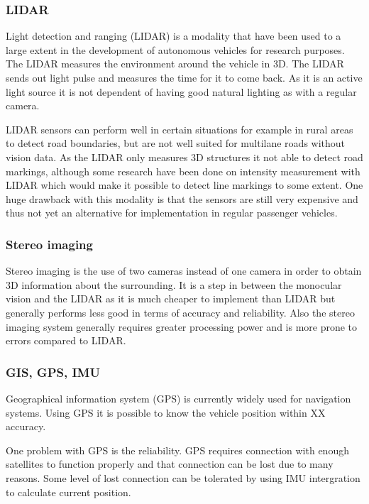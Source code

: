 \subsubsection{LIDAR}
Light detection and ranging (LIDAR) is a modality that have been used to a large extent in the development of autonomous vehicles for research purposes. The LIDAR measures the environment around the vehicle in 3D. The LIDAR sends out light pulse and measures the time for it to come back. As it is an active light source it is not dependent of having good natural lighting as with a regular camera. 

LIDAR sensors can perform well in certain situations for example in rural areas to detect road boundaries, \cite{BarHillel2014} but are not well suited for multilane roads without vision data. As the LIDAR only measures 3D structures it not able to detect road markings, although some research have been done on intensity measurement with LIDAR \cite{huang2009finding} \cite{kammel2008lidar} which would make it possible to detect line markings to some extent. One huge drawback with this modality is that the sensors are still very expensive and thus not yet an alternative for implementation in regular passenger vehicles.

\subsubsection{Stereo imaging}
Stereo imaging is the use of two cameras instead of one camera in order to obtain 3D information about the surrounding. It is a step in between the monocular vision and the LIDAR as it is much cheaper to implement than LIDAR but generally performs less good in terms of accuracy and reliability.  Also the stereo imaging system generally requires greater processing power and is more prone to errors compared to LIDAR. 


\subsubsection{GIS, GPS, IMU}
Geographical information system (GPS) is currently widely used for navigation systems. Using GPS it is possible to know the vehicle position within XX accuracy. 

One problem with GPS is the reliability. GPS requires connection with enough satellites to function properly and that connection can be lost due to many reasons. Some level of lost connection can be tolerated by using IMU intergration to calculate current position. 




